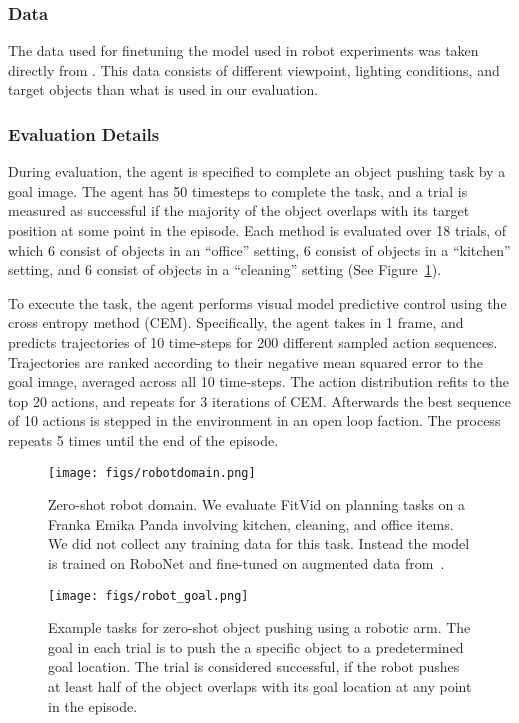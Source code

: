 \documentclass{article}
\newcommand{\model}{FitVid\xspace}
\begin{document}
\subsubsection{Data}

The data used for finetuning the model used in robot experiments was taken directly from \citet{wu2021greedy}. This data consists of different viewpoint, lighting conditions, and target objects than what is used in our evaluation. 


\subsubsection{Evaluation Details}

During evaluation, the agent is specified to complete an object pushing task by a goal image. The agent has 50 timesteps to complete the task, and a trial is measured as successful if the majority of the object overlaps with its target position at some point in the episode. Each method is evaluated over 18 trials, of which 6 consist of objects in an ``office'' setting, 6 consist of objects in a ``kitchen'' setting, and 6 consist of objects in a ``cleaning'' setting (See Figure~\ref{fig:robotdomains}).

To execute the task, the agent performs visual model predictive control using the cross entropy method (CEM). Specifically, the agent takes in 1 frame, and predicts trajectories of 10 time-steps for 200 different sampled action sequences. Trajectories are ranked according to their negative mean squared error to the goal image, averaged across all 10 time-steps. The action distribution refits to the top 20 actions, and repeats for 3 iterations of CEM. Afterwards the best sequence of 10 actions is stepped in the environment in an open loop faction. The process repeats 5 times until the end of the episode.

\begin{figure}[t]
  \centering
  \texttt{[image: figs/robotdomain.png]}
  \caption{Zero-shot robot domain. We evaluate \model on planning tasks on a Franka Emika Panda involving kitchen, cleaning, and office items. We did not collect any training data for this task. Instead the model is trained on RoboNet and fine-tuned on augmented data from~\citet{wu2021greedy}.}
  \label{fig:robotdomains}
\end{figure}

\begin{figure}[b]
  \centering
  \texttt{[image: figs/robot\_goal.png]}
  \caption{Example tasks for zero-shot object pushing using a robotic arm. The goal in each trial is to push the a specific object to a predetermined goal location. The trial is considered successful, if the robot pushes at least half of the object overlaps with its goal location at any point in the episode.}
\end{figure}
\end{document}
